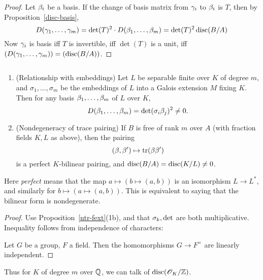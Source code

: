\begin{proof}
Let $\beta_i$ be a basis. 
If the change of basis matrix from $\gamma_i$ to $\beta_i$ is $T$, then by Proposition~\ref{disc-basis},
\[
D(\gamma_1,\ldots, \gamma_m)=\det(T)^2\cdot D(\beta_1,\ldots, \beta_m)
=\det(T)^2\operatorname{disc}(B/A)
\]
Now $\gamma_i$ is basis iff $T$ is invertible, iff $\det(T)$ is a unit, iff $(D(\gamma_1,\ldots, \gamma_m))=(\operatorname{disc}(B/A))$.
\end{proof}
\begin{pr}$\,$
\begin{enumerate}
\item (Relationship with embeddings)
Let $L$ be separable finite over $K$ of degree $m$, and $\sigma_1,\ldots,\sigma_m$ be the embeddings of $L$ into a Galois extension $M$ fixing $K$. Then for any basis $\beta_1,\ldots, \beta_m$ of $L$ over $K$,
\[
D(\beta_1,\ldots, \beta_m)=\det(\sigma_i\beta_j)^2\neq 0.
\]
\item (Nondegeneracy of trace pairing) If $B$ is free of rank $m$ over $A$ (with fraction fields $K,L$ as above), then the pairing \[(\beta,\beta')\mapsto \operatorname{tr}(\beta\beta')\] is a perfect $K$-bilinear pairing, and $\operatorname{disc}(B/A)=\operatorname{disc}(K/L)\neq 0$.
\end{enumerate}
Here {\it perfect} means that the map $a\mapsto (b\mapsto (a,b))$ is an isomorphism $L\to L^*$, and similarly for $b\mapsto (a\mapsto(a,b))$. This is equivalent to saying that the bilinear form is nondegenerate. %
\end{pr}
\begin{proof}
Use Proposition~\ref{ntr-fext}(1b), and that $\sigma_k,\det$ are both multiplicative. Inequality follows from independence of characters:

Let $G$ be a group, $F$ a field. Then the homomorphisms $G\to F^{\times}$ are linearly independent. 
\end{proof}
Thus for $K$ of degree $m$ over $\mathbb{Q}$, we can talk of $\operatorname{disc}(\mathscr{O}_K/\mathbb{Z})$.

